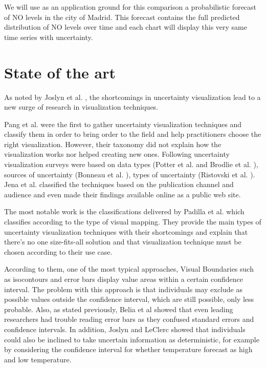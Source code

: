 \documentclass[a4paper,3p,sort&compress]{elsarticle}
\begin{document}
We will use as an application ground for this comparison a probabilistic forecast of NO levels 
in the city of Madrid. This forecast contains the full predicted distribution of NO levels over time
and each chart will display this very same time series with uncertainty. 

\section{State of the art}
\label{sec:results}

As noted by Joslyn et al. \cite{joslyn_communicating_2010}, the shortcomings in uncertainty visualization lead to a new surge of 
research in visualization techniques. 

Pang et al. \cite{pang_approaches_1997} were the first to gather uncertainty visualization techniques and classify them in 
order to bring order to the field and help 
practitioners choose the right visualization. However, their taxonomy did not explain how the visualization works nor helped creating new 
ones. Following uncertainty visualization surveys were based on data types (Potter et al. \cite{potter_quantification_2012} and Brodlie et al. 
\cite{brodlie_review_2012}), 
sources of uncertainty (Bonneau et al. \cite{bonneau_overview_2014}), types of uncertainty 
(Ristovski et al. \cite{ristovski_uncertainty_2014}). Jena et al. \cite{jena_uncertainty_2020} classified the techniques 
based on the publication channel and audience and even made their findings available online as a 
public web site. 

The most notable work is the classifications delivered by Padilla et al. \cite{padilla_uncertainty_2021} which classifies according to 
the type of visual mapping. They provide the main types of uncertainty visualization techniques with their shortcomings and 
explain that there's no one size-fits-all solution and that visualization technique must be chosen according to their use case.

According to them, one of the most typical approaches, Visual Boundaries such as isocontours and error 
bars display value areas within a certain confidence interval. The problem with this approach is 
that individuals may exclude as possible values outside the confidence interval, which are still 
possible, only less probable. Also, as stated previously, Belia et al \cite{belia_researchers_2005} showed that even leading researchers had 
trouble reading error bars as they confused 
standard errors and confidence intervals. In addition, Joslyn and LeClerc showed that individuals could also be inclined to take uncertain 
information as deterministic, for example by considering the confidence interval for whether temperature 
forecast as high and low temperature. 
\end{document}
